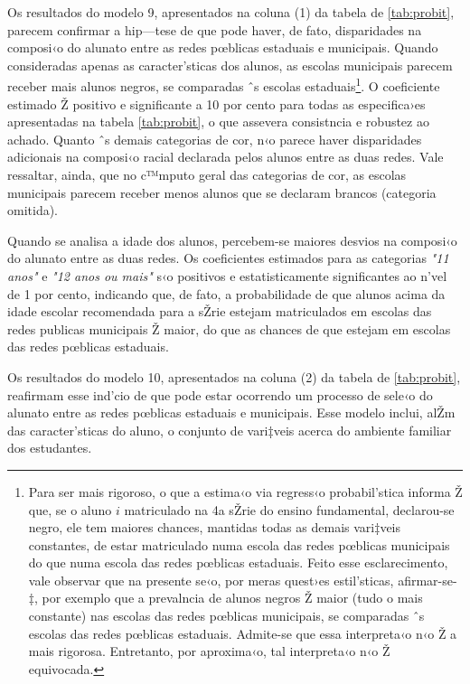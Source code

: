 \documentclass[a4paper, 12pt]{article}
\begin{document}
Os resultados do modelo 9, apresentados na coluna (1) da tabela  de \ref{tab:probit}, parecem confirmar a hip—tese de que pode haver, de fato, disparidades na composi‹o do alunato entre as redes pœblicas estaduais e municipais. Quando consideradas apenas as caracter’sticas dos alunos, as escolas municipais parecem receber mais alunos negros, se comparadas ˆs escolas estaduais\footnote{Para ser mais rigoroso, o que a estima‹o via regress‹o probabil’stica informa Ž que, se o aluno $i$ matriculado na 4a sŽrie do ensino fundamental, declarou-se negro, ele tem maiores chances, mantidas todas as demais vari‡veis constantes, de estar matriculado numa escola das redes pœblicas municipais do que numa escola das redes pœblicas estaduais. Feito esse esclarecimento, vale observar que na presente se‹o, por meras quest›es estil’sticas, afirmar-se-‡, por exemplo que a prevalncia de alunos negros Ž maior (tudo o mais constante) nas escolas das redes pœblicas municipais, se comparadas ˆs escolas das redes pœblicas estaduais. Admite-se que essa interpreta‹o n‹o Ž a mais rigorosa. Entretanto, por aproxima‹o, tal interpreta‹o n‹o Ž equivocada.}. O coeficiente estimado Ž positivo e significante a 10 por cento para todas as especifica›es apresentadas na tabela \ref{tab:probit}, o que assevera consistncia e robustez ao achado. Quanto ˆs demais categorias de cor, n‹o parece haver disparidades adicionais na composi‹o racial declarada pelos alunos entre as duas redes. Vale ressaltar, ainda, que no c™mputo geral das categorias de cor, as escolas municipais parecem receber menos alunos que se declaram brancos (categoria omitida).

Quando se analisa a idade dos alunos, percebem-se maiores desvios na composi‹o do alunato entre as duas redes. Os coeficientes estimados para as categorias  \emph{"11 anos"} e \emph{"12 anos ou mais"} s‹o positivos e estatisticamente significantes ao n’vel de 1 por cento, indicando que, de fato, a probabilidade de que alunos acima da idade escolar recomendada para a sŽrie estejam matriculados em escolas das redes publicas municipais Ž maior, do que as chances de que estejam em escolas das redes pœblicas estaduais. 

Os resultados do modelo 10, apresentados na coluna (2) da tabela de \ref{tab:probit}, reafirmam esse ind’cio de que pode estar ocorrendo um processo de sele‹o do alunato entre as redes pœblicas estaduais e municipais. Esse modelo inclui, alŽm das caracter’sticas do aluno, o conjunto de vari‡veis acerca do ambiente familiar dos estudantes.
\end{document}
